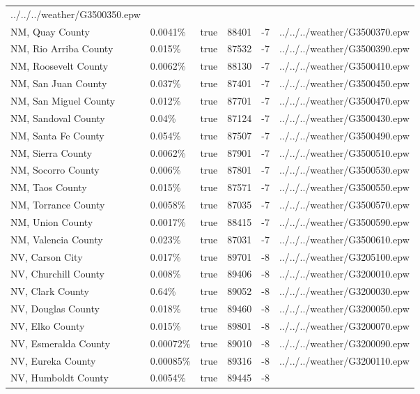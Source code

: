 \begin{longtable}[]{@{}llllll@{}}
../../../weather/G3500350.epw \\
NM, Quay County & 0.0041\% & true & 88401 & -7 &
../../../weather/G3500370.epw \\
NM, Rio Arriba County & 0.015\% & true & 87532 & -7 &
../../../weather/G3500390.epw \\
NM, Roosevelt County & 0.0062\% & true & 88130 & -7 &
../../../weather/G3500410.epw \\
NM, San Juan County & 0.037\% & true & 87401 & -7 &
../../../weather/G3500450.epw \\
NM, San Miguel County & 0.012\% & true & 87701 & -7 &
../../../weather/G3500470.epw \\
NM, Sandoval County & 0.04\% & true & 87124 & -7 &
../../../weather/G3500430.epw \\
NM, Santa Fe County & 0.054\% & true & 87507 & -7 &
../../../weather/G3500490.epw \\
NM, Sierra County & 0.0062\% & true & 87901 & -7 &
../../../weather/G3500510.epw \\
NM, Socorro County & 0.006\% & true & 87801 & -7 &
../../../weather/G3500530.epw \\
NM, Taos County & 0.015\% & true & 87571 & -7 &
../../../weather/G3500550.epw \\
NM, Torrance County & 0.0058\% & true & 87035 & -7 &
../../../weather/G3500570.epw \\
NM, Union County & 0.0017\% & true & 88415 & -7 &
../../../weather/G3500590.epw \\
NM, Valencia County & 0.023\% & true & 87031 & -7 &
../../../weather/G3500610.epw \\
NV, Carson City & 0.017\% & true & 89701 & -8 &
../../../weather/G3205100.epw \\
NV, Churchill County & 0.008\% & true & 89406 & -8 &
../../../weather/G3200010.epw \\
NV, Clark County & 0.64\% & true & 89052 & -8 &
../../../weather/G3200030.epw \\
NV, Douglas County & 0.018\% & true & 89460 & -8 &
../../../weather/G3200050.epw \\
NV, Elko County & 0.015\% & true & 89801 & -8 &
../../../weather/G3200070.epw \\
NV, Esmeralda County & 0.00072\% & true & 89010 & -8 &
../../../weather/G3200090.epw \\
NV, Eureka County & 0.00085\% & true & 89316 & -8 &
../../../weather/G3200110.epw \\
NV, Humboldt County & 0.0054\% & true & 89445 & -8 &

\end{longtable}
